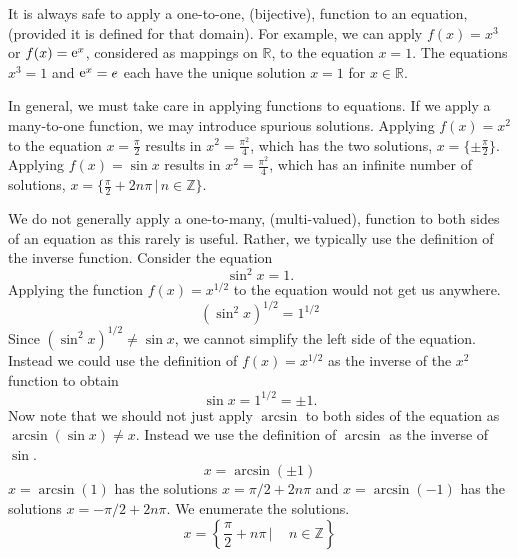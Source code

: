 It is always safe to apply a one-to-one, (bijective), function to an equation, 
(provided it is defined for that
domain).  For example, we can apply $f(x) = x^3$ or $f(x) = \mathop{\mathrm{e}}\nolimits^x$,
considered as mappings on $\mathbb{R}$, to the 
equation $x = 1$.  The equations $x^3 = 1$ and $\mathop{\mathrm{e}}\nolimits^x = e$ each have the unique
solution $x = 1$ for $x \in \mathbb{R}$.


In general, we must take care in applying functions to equations.
If we apply a many-to-one function, we may introduce spurious
solutions.  Applying $f(x) = x^2$ to the equation
$x = \frac{\pi}{2}$ results in $x^2 = \frac{\pi^2}{4}$, which has the two solutions,
$x = \{ \pm \frac{\pi}{2} \}$.
Applying $f(x) = \sin x$ results in $x^2 = \frac{\pi^2}{4}$, which has 
an infinite number of solutions,
$x = \{ \frac{\pi}{2} + 2 n \pi \,|\, n \in \mathbb{Z} \}$.




We do not generally apply a one-to-many, (multi-valued), function to 
both sides of an equation as this rarely is useful.  Rather, we typically
use the definition of the inverse function.  Consider the equation
\[
\sin^2 x = 1.
\]
Applying the function $f(x) = x^{1/2}$ to the equation would not get us 
anywhere.
\[
\left( \sin^2 x \right)^{1/2} = 1^{1/2}
\]
Since $(\sin^2 x)^{1/2} \neq \sin x$, we cannot simplify the 
left side of the equation.  Instead we could use the definition of
$f(x) = x^{1/2}$ as the inverse of the $x^2$ function to obtain
\[
\sin x = 1^{1/2} = \pm 1.
\]
Now note that we should not just apply $\arcsin$ to both sides of the equation
as $\arcsin(\sin x) \neq x$.
Instead we use the definition of $\arcsin$ as the inverse of $\sin$.
\[
x = \arcsin( \pm 1)
\]
$x = \arcsin(1)$ has the solutions $x = \pi/2 + 2 n \pi$ and $x = \arcsin(-1)$
has the solutions $x = -\pi/2 + 2 n \pi$.  We enumerate the solutions.
\[
x = \left\{ \frac{\pi}{2} + n \pi \,|\, \quad n \in \mathbb{Z} \right\}
\]










